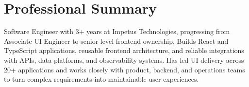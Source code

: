 \section{Professional Summary}
Software Engineer with 3+ years at Impetus Technologies, progressing
from Associate UI Engineer to senior-level frontend ownership. Builds React and
TypeScript applications, reusable frontend architecture, and reliable
integrations with APIs, data platforms, and observability systems. Has led UI
delivery across 20+ applications and works closely with product, backend, and
operations teams to turn complex requirements into maintainable user
experiences.
